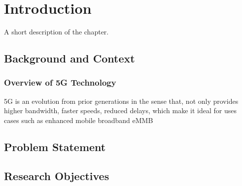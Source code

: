 \chapter{Introduction}%
\label{chapter:introduction}

\begin{introduction}
A short description of the chapter.
\end{introduction}

\section{Background and Context}

\subsection{Overview of 5G Technology}


5G is an evolution from prior generations in the sense that, not only provides higher bandwidth, faster speeds, reduced delays, which make it ideal for uses cases such as enhanced mobile broadband \ac{eMMB}

\section{Problem Statement}


\section{Research Objectives}



